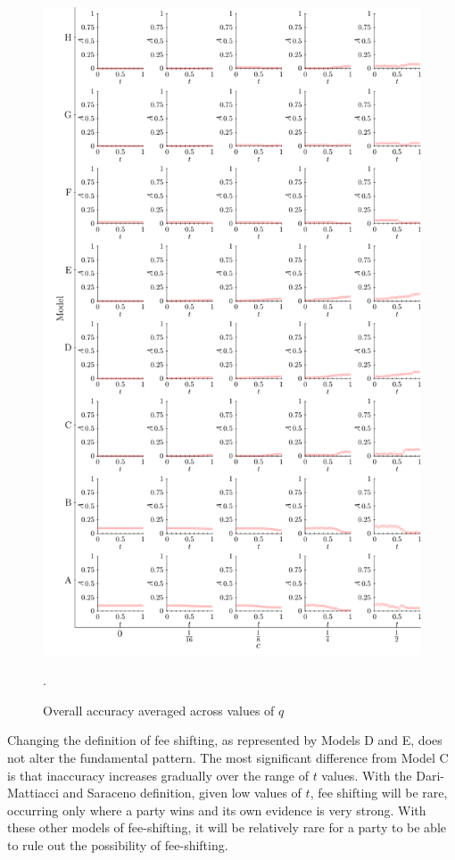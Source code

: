 \documentclass{article}
\begin{document}
\begin{figure}[h!]
\centering
\includegraphics[scale=0.55, trim={0.05in 0.15in 0in 0in}, clip]{../Figures/AverageAccuracy.pdf}
\vspace*{-2mm}
\caption{Overall accuracy averaged across values of $q$}. 
\label{fig:aggregatedaccuracy}
\end{figure}

Changing the definition of fee shifting, as represented by Models D and E, does not alter the fundamental pattern. The most significant difference from Model C is that inaccuracy increases gradually over the range of $t$ values. With the Dari-Mattiacci and Saraceno definition, given low values of $t$, fee shifting will be rare, occurring only where a party wins and its own evidence is very strong. With these other models of fee-shifting, it will be relatively rare for a party to be able to rule out the possibility of fee-shifting. 
\end{document}
